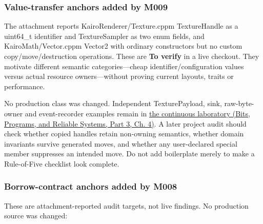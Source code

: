 \subsubsection{Value-transfer anchors added by M009}\label{appendix-4e2236f53445-value-transfer-anchors-added-by-m009}

\hypertarget{appendix-4e2236f53445-value-transfer-anchors-added-by-m009}{}

The attachment reports KairoRenderer/Texture.cppm TextureHandle as a uint64\_t identifier and TextureSampler as two enum fields, and KairoMath/Vector.cppm Vector2 with ordinary constructors but no custom copy/move/destruction operations. These are \textbf{To verify} in a live checkout. They motivate different semantic categories---cheap identifier/configuration values versus actual resource owners---without proving current layouts, traits or performance.

No production class was changed. Independent TexturePayload, sink, raw-byte-owner and event-recorder examples remain in \href{../01-Bits-Programs-and-Reliable-Systems-P03/main.pdf\#nameddest=01-foundations-i-ch004-complete-runnable-value-transfer-laboratory}{the continuous laboratory (Bits, Programs, and Reliable Systems, Part 3, Ch. 4)}. A later project audit should check whether copied handles retain non-owning semantics, whether domain invariants survive generated moves, and whether any user-declared special member suppresses an intended move. Do not add boilerplate merely to make a Rule-of-Five checklist look complete.

\subsubsection{Borrow-contract anchors added by M008}\label{appendix-4e2236f53445-borrow-contract-anchors-added-by-m008}

\hypertarget{appendix-4e2236f53445-borrow-contract-anchors-added-by-m008}{}

These are attachment-reported audit targets, not live findings. No production source was changed:

